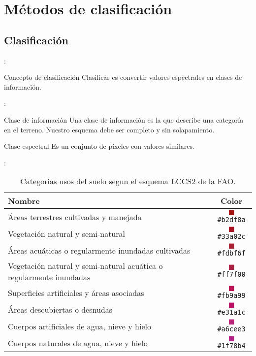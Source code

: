 \section{Métodos de clasificación}

\subsection{Clasificación}
\begin{frame}{\secname : \subsecname}
\begin{block}{Concepto de clasificación}
  Clasificar es convertir valores espectrales en clases de información.
\end{block}
\end{frame}

\begin{frame}{\secname : \subsecname}
\begin{block}{Clase de información}
  Una clase de información es la que describe una categoría en el terreno. \pause Nuestro esquema debe ser completo y sin solapamiento.
\end{block}
\pause
\begin{block}{Clase espectral}
  Es un conjunto de píxeles con valores similares.
\end{block}
\end{frame}

\begin{frame}{\secname : \subsecname}
  \begin{table}[hbt]
      \centering
      \begin{tabular}{p{12cm}c}
          \toprule
          Nombre & Color \\
          \midrule
          Áreas terrestres cultivadas y manejada & \textcolor{A11}{$\blacksquare$}\texttt{\#b2df8a}
          \\
          Vegetación natural y semi-natural  & \textcolor{A12}{$\blacksquare$}\texttt{\#33a02c}\\
          Áreas acuáticas o regularmente inundadas cultivadas &
          \textcolor{A23}{$\blacksquare$}\texttt{\#fdbf6f}\\
          Vegetación natural y semi-natural acuática o
  	regularmente inundadas  & \textcolor{A24}{$\blacksquare$}\texttt{\#ff7f00}\\
          Superficies artificiales y áreas asociadas  &
          \textcolor{B15}{$\blacksquare$}\texttt{\#fb9a99}\\
          Áreas descubiertas o desnudas  & \textcolor{B16}{$\blacksquare$}\texttt{\#e31a1c}\\
          Cuerpos artificiales de agua, nieve y hielo  &
          \textcolor{B27}{$\blacksquare$}\texttt{\#a6cee3}\\
          Cuerpos naturales de agua, nieve y hielo &
          \textcolor{B28}{$\blacksquare$}\texttt{\#1f78b4}\\
          \bottomrule
      \end{tabular}
  \caption{\label{tab:usos}Categorias usos del suelo segun el esquema LCCS2 de la FAO.}
  \end{table}
\end{frame}

